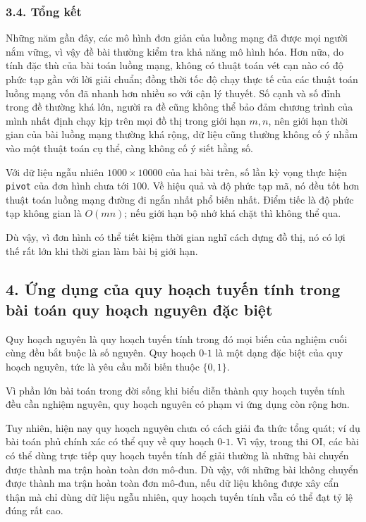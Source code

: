 \documentclass[11pt]{article}
\begin{document}
\subsubsection*{3.4. Tổng kết}

Những năm gần đây, các mô hình đơn giản của luồng mạng đã được mọi người nắm
vững, vì vậy đề bài thường kiểm tra khả năng mô hình hóa. Hơn nữa, do tính
đặc thù của bài toán luồng mạng, không có thuật toán vét cạn nào có độ phức
tạp gần với lời giải chuẩn; đồng thời tốc độ chạy thực tế của các thuật toán
luồng mạng vốn đã nhanh hơn nhiều so với cận lý thuyết. Số cạnh và số đỉnh
trong đề thường khá lớn, người ra đề cũng không thể bảo đảm chương trình của
mình nhất định chạy kịp trên mọi đồ thị trong giới hạn \(m,n\), nên giới hạn
thời gian của bài luồng mạng thường khá rộng, dữ liệu cũng thường không cố ý
nhằm vào một thuật toán cụ thể, càng không cố ý siết hằng số.

Với dữ liệu ngẫu nhiên \(1000\times 10000\) của hai bài trên, số lần kỳ vọng
thực hiện \texttt{pivot} của đơn hình chưa tới \(100\). Về hiệu quả và độ
phức tạp mã, nó đều tốt hơn thuật toán luồng mạng đường đi ngắn nhất phổ biến
nhất. Điểm tiếc là độ phức tạp không gian là \(O(mn)\); nếu giới hạn bộ nhớ
khá chặt thì không thể qua.

Dù vậy, vì đơn hình có thể tiết kiệm thời gian nghĩ cách dựng đồ thị, nó có
lợi thế rất lớn khi thời gian làm bài bị giới hạn.

\subsection*{4. Ứng dụng của quy hoạch tuyến tính trong bài toán quy hoạch nguyên đặc biệt}

Quy hoạch nguyên là quy hoạch tuyến tính trong đó mọi biến của nghiệm cuối
cùng đều bắt buộc là số nguyên. Quy hoạch \(0\)-\(1\) là một dạng đặc biệt của
quy hoạch nguyên, tức là yêu cầu mỗi biến thuộc \(\{0,1\}\).

Vì phần lớn bài toán trong đời sống khi biểu diễn thành quy hoạch tuyến tính
đều cần nghiệm nguyên, quy hoạch nguyên có phạm vi ứng dụng còn rộng hơn.

Tuy nhiên, hiện nay quy hoạch nguyên chưa có cách giải đa thức tổng quát; ví
dụ bài toán phủ chính xác có thể quy về quy hoạch \(0\)-\(1\). Vì vậy, trong
thi OI, các bài có thể dùng trực tiếp quy hoạch tuyến tính để giải thường là
những bài chuyển được thành ma trận hoàn toàn đơn mô-đun. Dù vậy, với những
bài không chuyển được thành ma trận hoàn toàn đơn mô-đun, nếu dữ liệu không
được xây cẩn thận mà chỉ dùng dữ liệu ngẫu nhiên, quy hoạch tuyến tính vẫn có
thể đạt tỷ lệ đúng rất cao.
\end{document}

